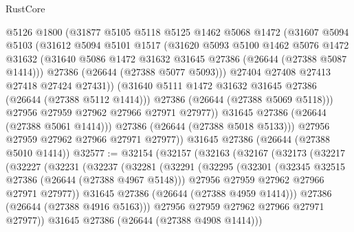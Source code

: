 \begin{lexlean}{RustCore}
\begin{coremodule}
                @5126
                @1800
                (@31877
                  @5105
                  @5118
                  @5125
                  @1462
                  @5068
                  @1472
                  (@31607
                    @5094
                    @5103
                    (@31612
                      @5094
                      @5101
                      @1517
                      (@31620
                        @5093
                        @5100
                        @1462
                        @5076
                        @1472
                        @31632
                        (@31640 @5086 @1472 @31632 @31645 @27386 (@26644 (@27388 @5087 @1414)))
                        @27386
                        (@26644 (@27388 @5077 @5093)))
                      @27404
                      @27408
                      @27413
                      @27418
                      @27424
                      @27431))
                  (@31640 @5111 @1472 @31632 @31645 @27386 (@26644 (@27388 @5112 @1414)))
                  @27386
                  (@26644 (@27388 @5069 @5118)))
                @27956
                @27959
                @27962
                @27966
                @27971
                @27977))
            @31645
            @27386
            (@26644 (@27388 @5061 @1414)))
          @27386
          (@26644 (@27388 @5018 @5133)))
        @27956
        @27959
        @27962
        @27966
        @27971
        @27977))
    @31645
    @27386
    (@26644 (@27388 @5010 @1414))
@32577 := @32154
    (@32157
      (@32163
        (@32167
          (@32173
            (@32217
              (@32227
                (@32231
                  (@32237
                    (@32281
                      (@32291
                        (@32295
                          (@32301
                            (@32345 @32515 @27386 (@26644 (@27388 @4967 @5148)))
                            @27956
                            @27959
                            @27962
                            @27966
                            @27971
                            @27977))
                        @31645
                        @27386
                        (@26644 (@27388 @4959 @1414)))
                      @27386
                      (@26644 (@27388 @4916 @5163)))
                    @27956
                    @27959
                    @27962
                    @27966
                    @27971
                    @27977))
                @31645
                @27386
                (@26644 (@27388 @4908 @1414)))

\end{coremodule}
\end{lexlean}
